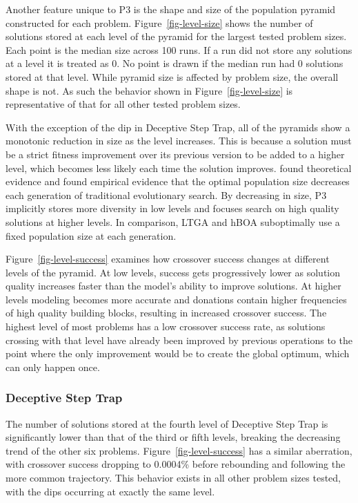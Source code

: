 Another feature unique to P3 is the shape and size of the population pyramid
constructed for each problem. Figure~\ref{fig-level-size} shows the number of solutions stored at
each level of the pyramid for the largest tested problem sizes. Each point is the
median size across 100 runs. If a run did not store any solutions at a level it is treated as 0.
No point is drawn if the median run had 0 solutions stored at that level. While pyramid size
is affected by problem size, the overall shape is not. As such the behavior shown in Figure~\ref{fig-level-size}
is representative of that for all other tested problem sizes.

With the exception of the dip in Deceptive Step Trap, all of the pyramids show a monotonic reduction
in size as the level increases. This is because a solution must be a strict fitness improvement
over its previous version to be added to a higher level, which becomes less likely
each time the solution improves. \cite{lobo:2011:dynamicpop} found theoretical evidence
and \cite{goldman:2011:dynamic-parameters} found empirical evidence that the optimal
population size decreases each generation of traditional evolutionary search.
By decreasing in size, P3 implicitly stores more diversity in low levels and focuses
search on high quality solutions at higher levels. In comparison,
LTGA and hBOA suboptimally use a fixed population size at each generation.

Figure~\ref{fig-level-success} examines how crossover success changes at different
levels of the pyramid. At low levels, success gets progressively lower
as solution quality increases faster than the model's ability to improve solutions.
At higher levels modeling becomes more accurate and donations contain higher frequencies
of high quality building blocks, resulting in increased crossover success. The
highest level of most problems has a low crossover success rate, as solutions
crossing with that level have already been improved by previous operations to
the point where the only improvement would be to create the global optimum, which can
only happen once.

\subsubsection{Deceptive Step Trap}
The number of solutions stored at the fourth level of Deceptive Step Trap is
significantly lower than that of the third or fifth levels, breaking the decreasing
trend of the other six problems. Figure~\ref{fig-level-success} has a similar
aberration, with crossover success dropping to  0.0004\% before rebounding and
following the more common trajectory. This behavior exists in all other problem
sizes tested, with the dips occurring at exactly the same level.

